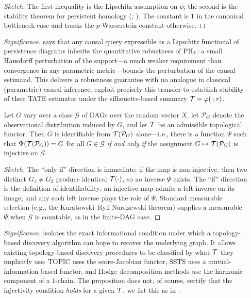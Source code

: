 \begin{proof}[Sketch]
The first inequality is the Lipschitz assumption on $\phi$; the second
is the stability theorem for persistent homology
(; \citealp{cohen2007stability,chazal2016structure}).
The constant is $1$ in the canonical bottleneck case and tracks the
$p$-Wasserstein constant otherwise.
\end{proof}

\emph{Significance.}  says that any causal
query expressible as a Lipschitz functional of persistence diagrams
inherits the quantitative robustness of $\mathrm{PH}_{k}$: a small Hausdorff
perturbation of the support---a much weaker requirement than convergence
in any parametric metric---bounds the perturbation of the causal
estimand. This delivers a robustness guarantee with no analogue in
classical (parametric) causal inference. \citet{kim2026topological}
exploit precisely this transfer to establish stability of their TATE
estimator under the silhouette-based summary $\mathcal{T} = \varphi(\cdot;r)$.

\begin{proposition}
\label{prop:identifiability}
Let $G$ vary over a class $\mathcal{G}$ of DAGs over the random vector
$X$, let $\mathcal{P}_G$ denote the observational distribution induced by
$G$, and let $\mathcal{T}$ be an admissible topological functor. Then $G$ is
identifiable from $\mathcal{T}(\mathcal{P}_G)$ alone---i.e., there is a function
$\Psi$ such that $\Psi(\mathcal{T}(\mathcal{P}_G)) = G$ for all $G \in \mathcal{G}$
\emph{if and only if} the assignment $G \mapsto \mathcal{T}(\mathcal{P}_G)$ is
injective on $\mathcal{G}$.
\end{proposition}

\begin{proof}[Sketch]
The ``only if'' direction is immediate: if the map is non-injective,
then two distinct $G_1 \neq G_2$ produce identical $\mathcal{T}(\cdot)$, so no
inverse $\Psi$ exists. The ``if'' direction is the definition of
identifiability: an injective map admits a left inverse on its image,
and any such left inverse plays the role of $\Psi$. Standard measurable
selection (e.g., the Kuratowski--Ryll-Nardzewski theorem) supplies a
measurable $\Psi$ when $\mathcal{G}$ is countable, as in the
finite-DAG case.
\end{proof}

\emph{Significance.}  isolates the exact
informational condition under which a topology-based discovery algorithm
can hope to recover the underlying graph. It allows existing
topology-based discovery procedures to be classified by what $\mathcal{T}$ they
implicitly use: TOPIC \citep{tran2024constraining} uses the
score-Jacobian functor, SSTS \citep{xu2025information} uses a mutual-
information-based functor, and Hodge-decomposition methods
\citep{nocurl2024} use the harmonic component of a $1$-chain. The
proposition does not, of course, certify that the injectivity condition
\emph{holds} for a given $\mathcal{T}$; we list this as
 in .

